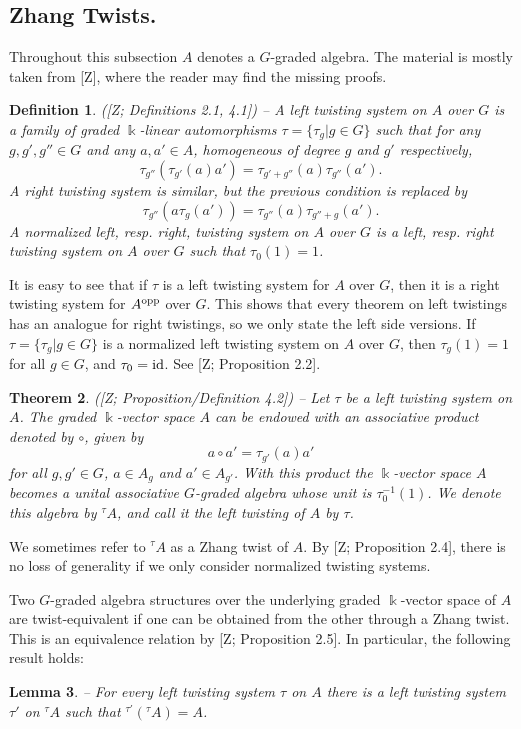 \documentclass[twoside,11pt]{article}
\newcommand{\id}{{\rm id}}
\renewcommand{\k}{\Bbbk}
\newcommand{\opp}{{\rm opp}}
\newtheorem{subtheorem}{Theorem}[subsection]
\newtheorem{subdefinition}[subtheorem]{Definition}
\newtheorem{sublemma}[subtheorem]{Lemma}
\begin{document}
\subsection{Zhang Twists.} \label{twistings}
Throughout this subsection $A$ denotes a $G$-graded algebra. The material is mostly taken
from [Z], where the reader may find the missing proofs. \\

\begin{subdefinition} ([Z; Definitions 2.1, 4.1]) --
\label{LTS}
A \emph{left twisting system} on $A$ over $G$ is a family of graded $\k$-linear
automorphisms $\tau = \{\tau_g| g \in G\}$ such that for any $g,g',g''\in G$ and any
$a,a'\in A$, homogeneous of degree $g$ and $g'$ respectively,
\[
\tau_{g''}(\tau_{g'}(a) a') = \tau_{g'+g''}(a) \tau_{g''}(a').
\]
A \emph{right twisting system} is similar, but the previous condition is replaced by
\[
\tau_{g''}(a \tau_g(a')) = \tau_{g''}(a)\tau_{g''+g}(a').
\]
A \emph{normalized} left, resp. right, twisting system on $A$ over $G$ is a left, resp.
right twisting system on $A$ over $G$ such that $\tau_0(1)=1$.
\end{subdefinition}
It is easy to see that if $\tau$ is a left twisting system for $A$ over $G$, then it is a
right twisting system for $A^\opp$ over $G$. This shows that every theorem on left
twistings has an analogue for right twistings, so we only state the left side versions.
If $\tau = \{\tau_g| g \in G\}$ is a normalized left twisting system on $A$ over $G$, then
$\tau_g(1)=1$ for all $g\in G$, and $\tau_0=\id$. See [Z; Proposition 2.2].

\begin{subtheorem} ([Z; Proposition/Definition 4.2]) --
\label{twisted-algebras}
Let $\tau$ be a left twisting system on $A$. The graded $\k$-vector space $A$ can be endowed
with an associative product denoted by $\circ$, given by
\[
a  \circ a' = \tau_{g'}(a) a'
\]
for all $g, g'\in G$, $a \in A_g$ and $a' \in A_{g'}$. With this product the $\k$-vector space
$A$ becomes a unital associative $G$-graded algebra whose unit is $\tau_0^{-1}(1)$. We
denote this algebra by $^\tau\! A$, and call it the \emph{left twisting} of $A$ by $\tau$.
\end{subtheorem}
We sometimes refer to ${}^\tau A$ as a Zhang twist of $A$. By [Z; Proposition 2.4], there
is no loss of generality if we only consider normalized twisting systems.

Two $G$-graded algebra structures over the underlying graded $\k$-vector space of $A$ are
twist-equivalent if one can be obtained from the other through a Zhang twist. This is
an equivalence relation by [Z; Proposition 2.5]. In particular, the following result
holds:
\begin{sublemma} 
\label{twisting-is-er} 
\label{twisted-eq-rel} --
For every left twisting system $\tau$ on $A$ there is a left twisting system $\tau'$ on
${}^\tau\! A$ such that ${}^{\tau'\!}({}^\tau\! A) = A$.
\end{sublemma}
\end{document}
